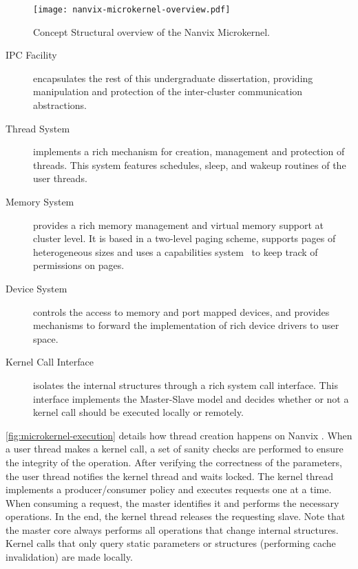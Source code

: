 		\begin{figure}[!tb]
			\centering%
			\caption{Concept Structural overview of the Nanvix Microkernel.}%
			\label{fig:microkernel-overview}%
			\texttt{[image: nanvix-microkernel-overview.pdf]}%
		\end{figure}

		\begin{description}

			\item[IPC Facility]
				encapsulates the rest of this undergraduate dissertation, providing
				manipulation and protection of the inter-cluster communication abstractions.
				
			\item[Thread System]
				implements a rich mechanism for creation, management and protection of threads.
				This system features schedules, sleep, and wakeup routines of the user threads.
				
			\item[Memory System]
				provides a rich memory management and virtual memory support at cluster level.
				It is based in a two-level paging scheme, supports pages of heterogeneous sizes
				and uses a capabilities system~\cite{Baumann2009} to keep track of permissions on pages.

			\item[Device System]
				controls the access to memory and port mapped devices, and provides
				mechanisms to forward the implementation of rich device drivers to user space.

			\item[Kernel Call Interface]
				isolates the \microkernel internal structures through a rich system call interface.
				This interface implements the Master-Slave \os model
				and decides whether or not a kernel call should be executed locally or remotely.

		\end{description}

		\autoref{fig:microkernel-execution} details how thread creation
		happens on Nanvix \microkernel.
		When a user thread makes a kernel call, a set of sanity checks are performed
		to ensure the integrity of the operation.
		After verifying the correctness of the parameters, the user thread notifies
		the kernel thread and waits locked.
		The kernel thread implements a producer/consumer policy and executes requests
		one at a time.
		When consuming a request, the master identifies it and performs the necessary operations.
		In the end, the kernel thread releases the requesting slave.
		Note that the master core always performs all operations that change internal
		\os structures.
		Kernel calls that only query static parameters or structures (performing cache invalidation) are made locally.


